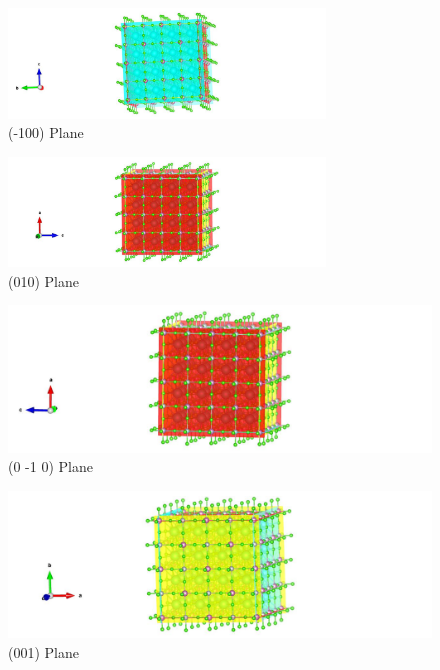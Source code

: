 \documentclass{homework}
\begin{document}
\begin{figure}[ht]
\centering
\includegraphics[width=0.75\textwidth]{q1part_h2.jpg}
\caption{(-100) Plane}
\end{figure}

\begin{figure}[ht]
\centering
\includegraphics[width=0.75\textwidth]{q1part_h3.jpg}
\caption{(010) Plane}
\end{figure}

\begin{figure}[ht]
\centering
\includegraphics[width=1\textwidth]{q1part_h4.jpg}
\caption{(0 -1 0) Plane}
\end{figure}

\begin{figure}[ht]
\centering
\includegraphics[width=1\textwidth]{q1part_h5.jpg}
\caption{(001) Plane}
\end{figure}
\end{document}

